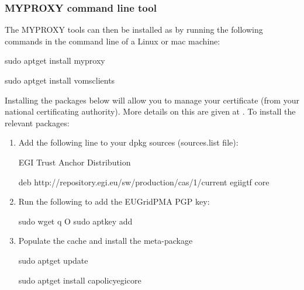 \documentclass[english]{book}
\begin{document}
\subsubsection{MYPROXY command line tool}
\label{\detokenize{Section3:myproxy-command-line-tool}}
The MYPROXY tools can then be installed as by running the following
commands in the command line of a Linux or mac machine:

%
\begin{sphinxVerbatim}[commandchars=\\\{\}]
sudo apt\PYGZhy{}get install myproxy

sudo apt\PYGZhy{}get install voms\PYGZhy{}clients
\end{sphinxVerbatim}

Installing the packages below will allow you to manage your certificate
(from your national certificating authority). More details on this are
given at . To install the
relevant packages:
\begin{enumerate}
\item {} 
Add the following line to your dpkg sources (sources.list file):

%
\begin{sphinxVerbatim}[commandchars=\\\{\}]
\PYGZsh{}\PYGZsh{}\PYGZsh{}\PYGZsh{} EGI Trust Anchor Distribution \PYGZsh{}\PYGZsh{}\PYGZsh{}\PYGZsh{}

deb http://repository.egi.eu/sw/production/cas/1/current egi\PYGZhy{}igtf core
\end{sphinxVerbatim}

\item {} 
Run the following to add the EUGridPMA PGP key:

%
\begin{sphinxVerbatim}[commandchars=\\\{\}]
sudo wget \PYGZhy{}q \PYGZhy{}O \textendash{}
    sudo apt\PYGZhy{}key add \textendash{}
\end{sphinxVerbatim}

\item {} 
Populate the cache and install the meta-package

%
\begin{sphinxVerbatim}[commandchars=\\\{\}]
sudo apt\PYGZhy{}get update

    sudo apt\PYGZhy{}get install ca\PYGZhy{}policy\PYGZhy{}egi\PYGZhy{}core
\end{sphinxVerbatim}

\end{enumerate}
\end{document}
